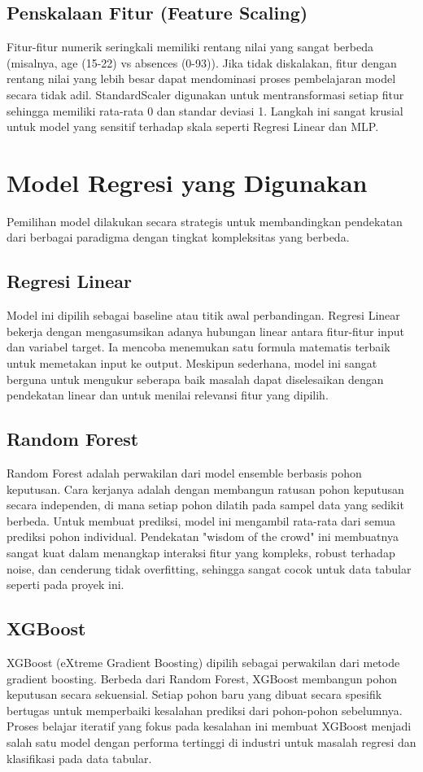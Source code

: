 \subsection{Penskalaan Fitur (Feature Scaling)}
Fitur-fitur numerik seringkali memiliki rentang nilai yang sangat berbeda (misalnya, age (15-22) vs absences (0-93)). Jika tidak diskalakan, fitur dengan rentang nilai yang lebih besar dapat mendominasi proses pembelajaran model secara tidak adil. StandardScaler digunakan untuk mentransformasi setiap fitur sehingga memiliki rata-rata 0 dan standar deviasi 1. Langkah ini sangat krusial untuk model yang sensitif terhadap skala seperti Regresi Linear dan MLP.

\section{Model Regresi yang Digunakan}
Pemilihan model dilakukan secara strategis untuk membandingkan pendekatan dari berbagai paradigma dengan tingkat kompleksitas yang berbeda.

\subsection{Regresi Linear}
Model ini dipilih sebagai baseline atau titik awal perbandingan. Regresi Linear bekerja dengan mengasumsikan adanya hubungan linear antara fitur-fitur input dan variabel target. Ia mencoba menemukan satu formula matematis terbaik untuk memetakan input ke output. Meskipun sederhana, model ini sangat berguna untuk mengukur seberapa baik masalah dapat diselesaikan dengan pendekatan linear dan untuk menilai relevansi fitur yang dipilih.

\subsection{Random Forest}
Random Forest adalah perwakilan dari model ensemble berbasis pohon keputusan. Cara kerjanya adalah dengan membangun ratusan pohon keputusan secara independen, di mana setiap pohon dilatih pada sampel data yang sedikit berbeda. Untuk membuat prediksi, model ini mengambil rata-rata dari semua prediksi pohon individual. Pendekatan "wisdom of the crowd" ini membuatnya sangat kuat dalam menangkap interaksi fitur yang kompleks, robust terhadap noise, dan cenderung tidak overfitting, sehingga sangat cocok untuk data tabular seperti pada proyek ini.

\subsection{XGBoost}
XGBoost (eXtreme Gradient Boosting) dipilih sebagai perwakilan dari metode gradient boosting. Berbeda dari Random Forest, XGBoost membangun pohon keputusan secara sekuensial. Setiap pohon baru yang dibuat secara spesifik bertugas untuk memperbaiki kesalahan prediksi dari pohon-pohon sebelumnya. Proses belajar iteratif yang fokus pada kesalahan ini membuat XGBoost menjadi salah satu model dengan performa tertinggi di industri untuk masalah regresi dan klasifikasi pada data tabular.

